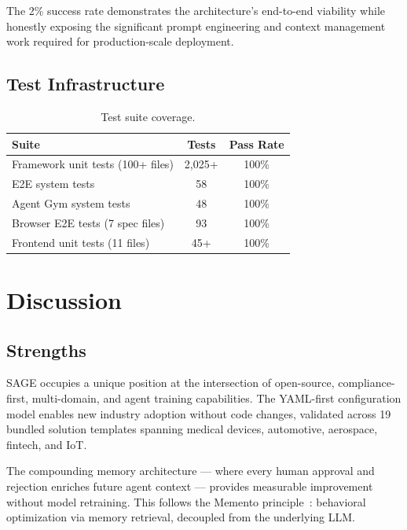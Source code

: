 \documentclass[11pt,a4paper]{article}
\begin{document}
The 2\% success rate demonstrates the architecture's end-to-end viability while honestly exposing the significant prompt engineering and context management work required for production-scale deployment.

\subsection{Test Infrastructure}

\begin{table}[h]
\centering
\caption{Test suite coverage.}
\label{tab:tests}
\begin{tabular}{lcc}
\toprule
\textbf{Suite} & \textbf{Tests} & \textbf{Pass Rate} \\
\midrule
Framework unit tests (100+ files) & 2{,}025+ & 100\% \\
E2E system tests & 58 & 100\% \\
Agent Gym system tests & 48 & 100\% \\
Browser E2E tests (7 spec files) & 93 & 100\% \\
Frontend unit tests (11 files) & 45+ & 100\% \\
\bottomrule
\end{tabular}
\end{table}

\section{Discussion}
\label{sec:discussion}

\subsection{Strengths}

SAGE occupies a unique position at the intersection of open-source, compliance-first, multi-domain, and agent training capabilities. The YAML-first configuration model enables new industry adoption without code changes, validated across 19 bundled solution templates spanning medical devices, automotive, aerospace, fintech, and IoT.

The compounding memory architecture --- where every human approval and rejection enriches future agent context --- provides measurable improvement without model retraining. This follows the Memento principle~\citep{memento2025}: behavioral optimization via memory retrieval, decoupled from the underlying LLM.
\end{document}
